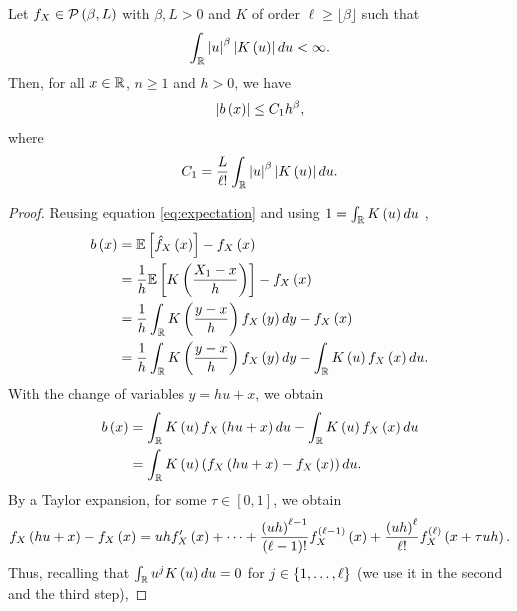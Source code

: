 \begin{proposition}\label{prop:2}
  Let $f_X\in \mathcal{P}\left(\beta,L\right)$ with $\beta,L >0$ and $K$ of order $\ell \geq \lfloor \beta \rfloor$ such that
  \begin{equation*}
    \int_{\mathbb{R}} \left| u\right|^\beta \left| K\left(u\right)\right|du <\infty.
  \end{equation*}
  Then, for all $x\in\mathbb{R}$, $n\geq 1$ and $h>0$, we have
  \begin{equation*}
    \left| b\left(x\right)\right|\leq C_1 h^\beta,
  \end{equation*}
  where
  \begin{equation*}
    C_1 = \frac{L}{\ell !}\int_{\mathbb{R}}\left| u\right|^{\beta} \left| K\left(u\right)\right| du.
  \end{equation*}
\end{proposition}
\begin{proof}
  Reusing equation \ref{eq:expectation} and using $1= \int_{\mathbb{R}} K\left(u\right)du$ ,
  \begin{equation*}
    \begin{split}
      b\left(x\right) & = \mathbb{E}\left[\hat{f}_X\left(x\right)\right] - f_X\left(x\right)                                                \\
              & = \frac{1}{h}\mathbb{E}\left[K\left(\frac{X_1-x}{h}\right)\right] - f_X\left(x\right)                               \\
              & = \frac{1}{h}\int_{\mathbb{R}} K\left(\frac{y-x}{h}\right) f_X\left(y\right)dy - f_X\left(x\right)                     \\
              & = \frac{1}{h}\int_{\mathbb{R}} K\left(\frac{y-x}{h}\right) f_X\left(y\right)dy - \int_{\mathbb{R}} K\left(u\right) f_X\left(x\right) du.
    \end{split}
  \end{equation*}
  With the change of variables $y = hu + x$, we obtain
  \begin{equation*}
    \begin{split}
      b\left(x\right) & = \int_{\mathbb{R}} K\left(u\right) f_X\left(hu+x\right)du - \int_{\mathbb{R}} K\left(u\right) f_X\left(x\right) du \\
              & = \int_{\mathbb{R}} K\left(u\right) \left(f_X\left(hu +x\right) - f_X\left(x\right)\right) du.
    \end{split}
  \end{equation*}
  By a Taylor expansion, for some $\tau \in [0,1]$, we obtain
  \begin{equation*}
    f_X\left(hu+x\right) - f_X\left(x\right) = uh f_X'\left(x\right) + \cdots  + \frac{\left(uh\right)^{\ell -1}}{\left(\ell -1\right)!} f_X^{\left(\ell -1\right)}\left(x\right)+ \frac{\left(uh\right)^\ell}{\ell !}f_X^{\left(\ell\right)}\left(x+\tau uh \right).
  \end{equation*}
  Thus, recalling that $\int_{\mathbb{R}} u^j K\left(u\right) du = 0$ for $j\in \left\{1,\ldots, \ell\right\}$ (we use it in the second and the third step),

\end{proof}
